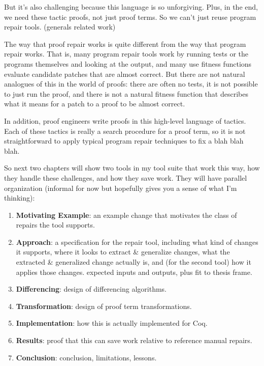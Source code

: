 But it's also challenging because this language is so unforgiving. Plus, in the end, we need these tactic proofs, not just proof terms. So we can't just reuse program repair tools. (generals related work)

The way that proof repair works is quite different from the way that program repair works.
That is, many program repair tools work by running tests or the programs themselves and looking at the output,
and many use fitness functions evaluate candidate patches that are almost correct.
But there are not natural analogues of this in the world of proofs:
there are often no tests, it is not possible to just run the proof, and there is not a natural 
fitness function that describes what it means for a patch to a proof to be almost correct.

In addition, proof engineers write proofs in this high-level language of tactics.
Each of these tactics is really a search procedure for a proof term, so it is not straightforward to apply
typical program repair techniques to fix a blah blah blah.

So next two chapters will show two tools in my tool suite that work this way, how they handle these challenges, and how they save work.
They will have parallel organization (informal for now but hopefully gives you a sense of what I'm thinking):

\begin{enumerate}
\item \textbf{Motivating Example}: an example change that motivates the class of repairs the tool supports.
\item \textbf{Approach}: a specification for the repair tool, including what kind of changes it supports, where it looks to extract \& generalize changes, what the extracted
\& generalized change actually is, and (for the second tool) how it applies those changes. expected inputs and outputs, plus fit to thesis frame.
\item \textbf{Differencing}: design of differencing algorithms.
\item \textbf{Transformation}: design of proof term transformations.
\item \textbf{Implementation}: how this is actually implemented for Coq.
\item \textbf{Results}: proof that this can save work relative to reference manual repairs.
\item \textbf{Conclusion}: conclusion, limitations, lessons.
\end{enumerate}


